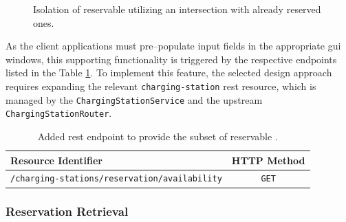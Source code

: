 \begin{figure}[h]
    \centering
    \caption{Isolation of reservable  utilizing an intersection with already reserved ones.}
    \label{fig:reservable-cs}
\end{figure}

\noindent As the client applications must pre--populate input fields in the appropriate \acrshort{gui} windows, this supporting functionality is triggered by the respective endpoints listed in the Table \ref{tab:reservable-cs-rest}. To implement this feature, the selected design approach requires expanding the relevant \texttt{charging-station} \acrshort{rest} resource, which is managed by the \texttt{ChargingStationService} and the upstream \texttt{ChargingStationRouter}.

\begingroup
\setlength{\tabcolsep}{10pt} %
\renewcommand{\arraystretch}{1.5} %
\begin{table}[h]
\centering
\caption{Added \acrshort{rest} endpoint to provide the subset of reservable .}
    \begin{tabular}{l|c}
    Resource Identifier & HTTP Method \\ \hline
    \texttt{/charging-stations/reservation/availability} & \texttt{GET}
    \end{tabular}
\label{tab:reservable-cs-rest}
\end{table}
\endgroup

\newpage

\subsubsection{Reservation Retrieval}
\label{ch:Implementation:sec:Reservation System:ssec:Additional Capabilities:sssec:Reservation Retrieval}

